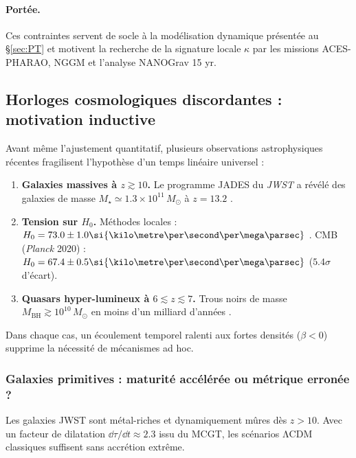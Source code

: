 \documentclass[11pt]{article}
\begin{document}
\paragraph{Portée.}
Ces contraintes servent de socle à la modélisation dynamique
présentée au §\ref{sec:PT} et motivent la recherche de la signature
locale \(\kappa\) par les missions ACES-PHARAO, NGGM et l’analyse
NANOGrav 15 yr.

\subsection{Horloges cosmologiques discordantes : motivation inductive}
\label{sec:anomalies}

Avant même l’ajustement quantitatif, plusieurs observations astrophysiques récentes fragilisent l’hypothèse d’un temps linéaire universel :

\begin{enumerate}[label=\alph*)]
  \item \textbf{Galaxies massives à \(z\gtrsim10\).}  
        Le programme JADES du \textit{JWST} a révélé des galaxies de masse
        \(M_\star \simeq 1.3\times10^{11}\,M_\odot\) à \(z = 13.2\)
        \parencite{Labbe2024,Robertson2024}.
  \item \textbf{Tension sur \(H_{0}\).}  
        Méthodes locales : \(H_{0}=73.0\pm1.0\si{\kilo\metre\per\second\per\mega\parsec}\)  
        \parencite{Freedman2024}.  
        CMB (\textit{Planck} 2020) : \(H_{0}=67.4\pm0.5\si{\kilo\metre\per\second\per\mega\parsec}\)  
        (\(5.4\sigma\) d’écart).
  \item \textbf{Quasars hyper-lumineux à \(6\lesssim z\lesssim7\).}  
        Trous noirs de masse \(M_{\mathrm{BH}}\gtrsim10^{10}\,M_\odot\)
        en moins d’un milliard d’années \parencite{Euclid2024}.
\end{enumerate}

Dans chaque cas, un écoulement temporel ralenti aux fortes densités
(\(\beta<0\)) supprime la nécessité de mécanismes ad hoc.

\subsubsection{Galaxies primitives : maturité accélérée ou métrique erronée ?}

Les galaxies JWST sont métal-riches et dynamiquement mûres dès \(z>10\).  
Avec un facteur de dilatation \(\dd\tau/\dd t \approx 2.3\) issu du MCGT,
les scénarios ΛCDM classiques suffisent sans accrétion extrême.
\end{document}
